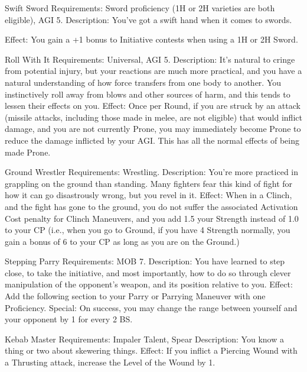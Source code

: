 \documentclass[oneside,11pt,english]{book}
\begin{document}
 

Swift Sword 
Requirements: Sword proficiency (1H or 2H varieties are both eligible), AGI 5. 
Description: You’ve got a swift hand when it comes to swords. 


Effect: You gain a +1 bonus to Initiative contests when using a 1H or 2H Sword. 

 

Roll With It 
Requirements: Universal, AGI 5. 
Description: It's natural to cringe from potential injury, but your reactions are much more practical, and 
you have a natural understanding of how force transfers from one body to another. You instinctively roll 
away from blows and other sources of harm, and this tends to lessen their effects on you. 
Effect: Once per Round, if you are struck by an attack (missile attacks, including those made in melee, 
are not eligible) that would inflict damage, and you are not currently Prone, you may immediately become 
Prone to reduce the damage inflicted by your AGI. This has all the normal effects of being made Prone. 

 

Ground Wrestler 
Requirements: Wrestling. 
Description: You’re more practiced in grappling on the ground than standing. Many fighters fear this 
kind of fight for how it can go disastrously wrong, but you revel in it. 
Effect: When in a Clinch, and the fight has gone to the ground, you do not suffer the associated 
Activation Cost penalty for Clinch Maneuvers, and you add 1.5 your Strength instead of 1.0 to your CP 
(i.e., when you go to Ground, if you have 4 Strength normally, you gain a bonus of 6 to your CP as long 
as you are on the Ground.) 

 

Stepping Parry 
Requirements: MOB 7. 
Description: You have learned to step close, to take the initiative, and most importantly, how to do so 
through clever manipulation of the opponent’s weapon, and its position relative to you. 
Effect: Add the following section to your Parry or Parrying Maneuver with one Proficiency. Special: On 
success, you may change the range between yourself and your opponent by 1 for every 2 BS. 

 

Kebab Master 
Requirements: Impaler Talent, Spear 
Description: You know a thing or two about skewering things. 
Effect: If you inflict a Piercing Wound with a Thrusting attack, increase the Level of the Wound by 1. 

 
\end{document}
